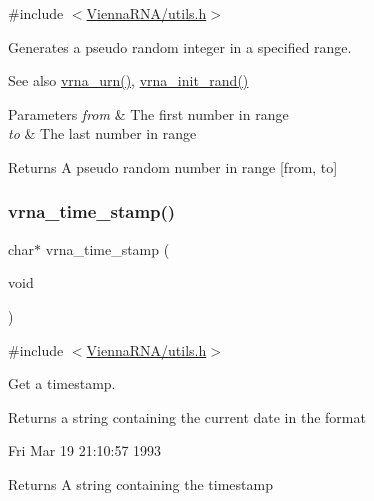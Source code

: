 {\ttfamily \#include $<$\hyperlink{utils_8h}{Vienna\+R\+N\+A/utils.\+h}$>$}



Generates a pseudo random integer in a specified range. 

\begin{DoxySeeAlso}{See also}
\hyperlink{group__utils_ga384e256ebb295d04a14426179db0dd6e}{vrna\+\_\+urn()}, \hyperlink{group__utils_ga0ad1f40ea316e5c5918695c35613027a}{vrna\+\_\+init\+\_\+rand()} 
\end{DoxySeeAlso}

\begin{DoxyParams}{Parameters}
{\em from} & The first number in range \\
\hline
{\em to} & The last number in range \\
\hline
\end{DoxyParams}
\begin{DoxyReturn}{Returns}
A pseudo random number in range \mbox{[}from, to\mbox{]} 
\end{DoxyReturn}
\mbox{\label{group__utils_gad3bbe8d01afb1310609cb018d5290550}} 
\subsubsection{\texorpdfstring{vrna\+\_\+time\+\_\+stamp()}{vrna\_time\_stamp()}}
{\footnotesize\ttfamily char$\ast$ vrna\+\_\+time\+\_\+stamp (\begin{DoxyParamCaption}\item[{void}]{ }\end{DoxyParamCaption})}



{\ttfamily \#include $<$\hyperlink{utils_8h}{Vienna\+R\+N\+A/utils.\+h}$>$}



Get a timestamp. 

Returns a string containing the current date in the format \begin{DoxyVerb}Fri Mar 19 21:10:57 1993 \end{DoxyVerb}


\begin{DoxyReturn}{Returns}
A string containing the timestamp 
\end{DoxyReturn}
\mbox{\label{group__utils_ga8ef1835eb83f542396f59f0b205965e5}} 
